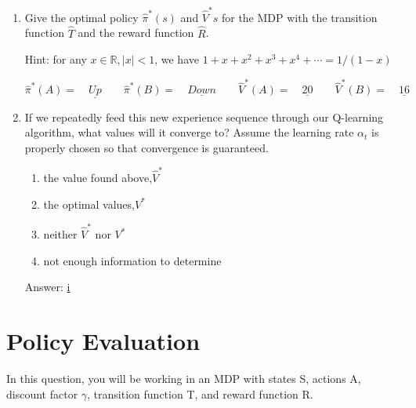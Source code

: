 \documentclass[11pt, answers]{exam}
\begin{document}
\begin{enumerate}
\begin{enumerate}
\item Give the optimal policy $\hat{\pi}^*(s)$ and $\hat{V}^*s$ for the MDP with the transition function $\hat{T}$ and the reward function $\hat{R}$.

Hint: for any $x \in \mathbb{R},|x|<1$, we have $1+x+x^{2}+x^{3}+x^{4}+\cdots=1 /(1-x)$

$$\hat{\pi}^*(A)=\underline{\quad Up \quad} \quad \hat{\pi}^*(B)=\underline{\quad Down \quad} \quad \hat{V}^*(A)=\underline{\quad 20 \quad} \quad \hat{V}^*(B)=\underline{\quad 16 \quad}$$

\item If we repeatedly feed this new experience sequence through our Q-learning algorithm, what values will it converge to? Assume the learning rate $\alpha_t$ is properly chosen so that convergence is guaranteed.
\begin{enumerate}
\item the value found above,$\hat{V}^*$
\item the optimal values,$V^*$
\item neither $\hat{V}^*$ nor $V^*$
\item not enough information to determine
\end{enumerate}
Answer: \underline{ i }
\end{enumerate}
\end{enumerate}

\newpage
\section{Policy Evaluation}

In this question, you will be working in an MDP with states S, actions A, discount factor $\gamma$, transition function T, and reward function R.\\
\end{document}
